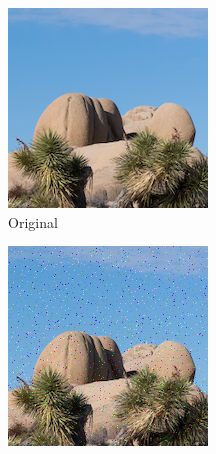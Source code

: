 \documentclass{article}
\begin{document}
\begin{figure}
    \centering
    \begin{subfigure}[b]{0.32\textwidth}
        \centering
        \includegraphics[width=\textwidth]{../Resource/cropped-image.png}
        \caption{Original}
        \label{fig:cropped-image-cyclic-bsc-original}
    \end{subfigure}
    \hfill
    \begin{subfigure}[b]{0.32\textwidth}
        \centering
        \includegraphics[width=\textwidth]{../Result/cropped-cyclic-bsc-output.png}

\end{subfigure}
\end{figure}
\end{document}
